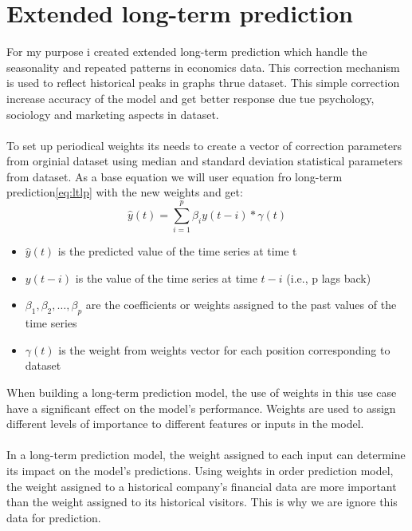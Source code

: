     \section{Extended long-term prediction} \label{sec:extlonglp}
    For my purpose i created extended long-term prediction which handle the seasonality and repeated patterns in economics data.
    This correction mechanism is used to reflect historical peaks in graphs thrue dataset. This simple correction increase accuracy of the
    model and get better response due tue psychology, sociology and marketing aspects in dataset.\\
    \\
    To set up periodical weights its needs to create a vector of correction parameters from orginial dataset using median and standard deviation
    statistical parameters from dataset.
    As a base equation we will user equation fro long-term prediction\ref{eq:ltlp} with the new weights and get:
    \begin{equation} \label{eq:ltlp}
        \hat{y}(t) = \sum_{i=1}^{p} \beta_i y(t-i) * \gamma(t)
    \end{equation}
    \begin{itemize}
        \item $\hat{y}(t)$ is the predicted value of the time series at time t
        \item $y(t-i)$ is the value of the time series at time $t-i$ (i.e., p lags back)
        \item $\beta_1, \beta_2, \dots, \beta_p$ are the coefficients or weights assigned to the past values of the time series
        \item $\gamma(t)$ is the weight from weights vector for each position corresponding to dataset
    \end{itemize}
    When building a long-term prediction model, the use of weights in this use case have a significant effect on the model's performance.
    Weights are used to assign different levels of importance to different features or inputs in the model.\\
    \\
    In a long-term prediction model, the weight assigned to each input can determine its impact on the model's predictions.
    Using weights in order prediction model, the weight assigned to a historical company's financial data are more important
    than the weight assigned to its historical visitors. This is why we are ignore this data for prediction.\\
    \\
